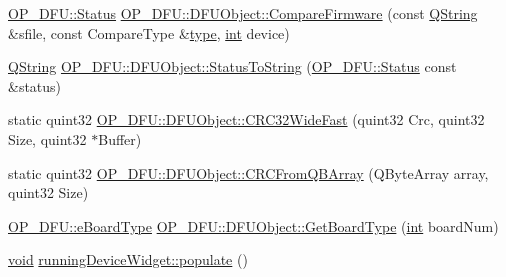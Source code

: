 \begin{DoxyCompactItemize}
\item 
\hyperlink{class_o_p___d_f_u_a83b075feaf572fe76e597acea58c8eda}{O\-P\-\_\-\-D\-F\-U\-::\-Status} \hyperlink{group___uploader_ga3c9852f8106d7177b5e27087f6e28764}{O\-P\-\_\-\-D\-F\-U\-::\-D\-F\-U\-Object\-::\-Compare\-Firmware} (const \hyperlink{group___u_a_v_objects_plugin_gab9d252f49c333c94a72f97ce3105a32d}{Q\-String} \&sfile, const Compare\-Type \&\hyperlink{glext_8h_a7d05960f4f1c1b11f3177dc963a45d86}{type}, \hyperlink{ioapi_8h_a787fa3cf048117ba7123753c1e74fcd6}{int} device)
\item 
\hyperlink{group___u_a_v_objects_plugin_gab9d252f49c333c94a72f97ce3105a32d}{Q\-String} \hyperlink{group___uploader_gae048f84f5abd2be97bbe40fcf6e193c4}{O\-P\-\_\-\-D\-F\-U\-::\-D\-F\-U\-Object\-::\-Status\-To\-String} (\hyperlink{class_o_p___d_f_u_a83b075feaf572fe76e597acea58c8eda}{O\-P\-\_\-\-D\-F\-U\-::\-Status} const \&status)
\item 
static quint32 \hyperlink{group___uploader_gae755106568ea0611498e45e43bfa9e4d}{O\-P\-\_\-\-D\-F\-U\-::\-D\-F\-U\-Object\-::\-C\-R\-C32\-Wide\-Fast} (quint32 Crc, quint32 Size, quint32 $\ast$Buffer)
\item 
static quint32 \hyperlink{group___uploader_ga8b3213586813e0e852bd8e8460f02fc0}{O\-P\-\_\-\-D\-F\-U\-::\-D\-F\-U\-Object\-::\-C\-R\-C\-From\-Q\-B\-Array} (Q\-Byte\-Array array, quint32 Size)
\item 
\hyperlink{class_o_p___d_f_u_a7226d41298447c34a2c489cb47c470bd}{O\-P\-\_\-\-D\-F\-U\-::e\-Board\-Type} \hyperlink{group___uploader_ga9376138780f2860b37c7b9ae8af3f799}{O\-P\-\_\-\-D\-F\-U\-::\-D\-F\-U\-Object\-::\-Get\-Board\-Type} (\hyperlink{ioapi_8h_a787fa3cf048117ba7123753c1e74fcd6}{int} board\-Num)
\item 
\hyperlink{group___u_a_v_objects_plugin_ga444cf2ff3f0ecbe028adce838d373f5c}{void} \hyperlink{group___uploader_ga361969437ae7c23ebaa3d646e742dbc5}{running\-Device\-Widget\-::populate} ()
\end{DoxyCompactItemize}
